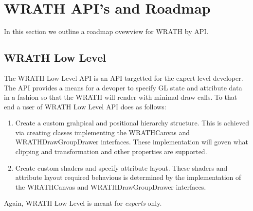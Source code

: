 \documentclass[a4paper,11pt]{article}
\begin{document}
\section{WRATH API's and Roadmap}
\begin{indenter}{2cm}

In this section we outline a roadmap ovewview for WRATH by API.
\subsection{WRATH Low Level}
\begin{indenter}{1cm}
The WRATH Low Level API is an API targetted for the expert level developer.
The API provides a means for a devoper to specify GL state and attribute data
in a fashion so that the WRATH will render with minimal draw calls. To that end
a user of WRATH Low Level API does as follows: 
\begin{enumerate}
\item Create a custom grahpical and positional hierarchy structure. This is achieved via creating classes implementing the WRATHCanvas and WRATHDrawGroupDrawer interfaces. These implementation will goven what clipping and transformation and other properties are supported. 
\item Create custom shaders and specify attribute layout. These shaders and attribute layout required behavious is determined by the implementation of the WRATHCanvas and WRATHDrawGroupDrawer interfaces.
\end{enumerate}
\end{indenter}

Again, WRATH Low Level is meant for \textit{experts} only.


\end{indenter}
\end{document}
